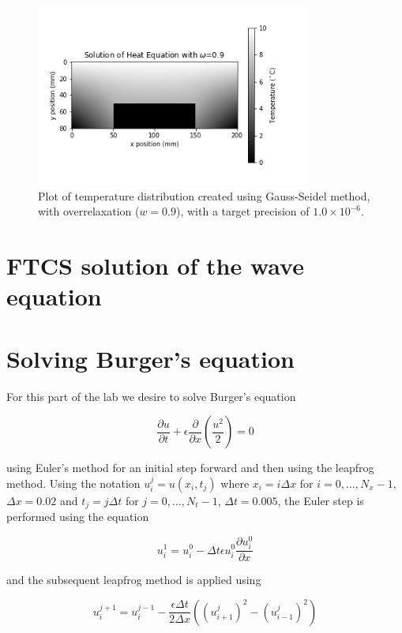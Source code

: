 \documentclass{article}
\begin{document}
\begin{figure}[H]
	\centering
	\includegraphics[width=0.8\textwidth]{../images/q1_c.png}
	\caption{Plot of temperature distribution created using Gauss-Seidel method, with overrelaxation ($w=0.9$), with a target precision of $1.0\times 10^{-6}$.}
	\label{fig:1c}
\end{figure}


\section{FTCS solution of the wave equation}

\section{Solving Burger's equation}
For this part of the lab we desire to solve Burger's equation

\begin{equation}
	\frac{\partial u}{\partial t} + \epsilon \frac{\partial}{\partial x}(\frac{u^2}{2}) = 0
\end{equation}

using Euler's method for an initial step forward and then using the leapfrog method.
Using the notation $u^j_i = u(x_i, t_j)$ where $x_i = i\Delta x$ for $i=0,...,N_x-1$, $\Delta x=0.02$ and $t_j = j\Delta t$ for $j=0,...,N_t-1$, $\Delta t=0.005$, the Euler step is performed using the equation

\begin{equation}
	u^1_i = u^0_i - \Delta t\epsilon u^0_i\frac{\partial u^0_i}{\partial x}
\end{equation}

and the subsequent leapfrog method is applied using

\begin{equation}
	u^{j+1}_i = u^{j-1}_i - \frac{\epsilon\Delta t}{2\Delta x}((u^j_{i+1})^2 - (u^j_{i-1})^2)
\end{equation}
\end{document}
